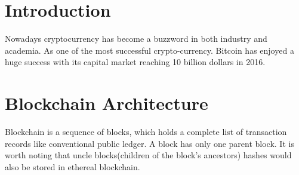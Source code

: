 \documentclass{article}
\begin{document}
	\section{Introduction}
	Nowadays cryptocurrency has become a buzzword in both industry and academia. As one of the
	most successful crypto-currency. Bitcoin has enjoyed a huge success with its capital market
	reaching 10 billion dollars in 2016.
	\section{Blockchain Architecture}
	Blockchain is a sequence of blocks, which holds a complete list of transaction records like
	conventional public ledger. A block has only one parent block. It is worth noting that uncle
	blocks(children of the block’s ancestors) hashes would also be stored in ethereal blockchain.
\end{document}
